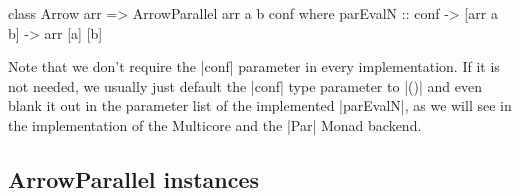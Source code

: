 \begin{code}
class Arrow arr => ArrowParallel arr a b conf where
	parEvalN :: conf -> [arr a b] -> arr [a] [b]
\end{code}
Note that we don't require the |conf| parameter in every implementation. If it is not needed, we usually just default the |conf| type parameter to |()| and even blank it out in the parameter list of the implemented |parEvalN|, as we will see in the implementation of the Multicore and the |Par| Monad backend.

\subsection{ArrowParallel instances}

